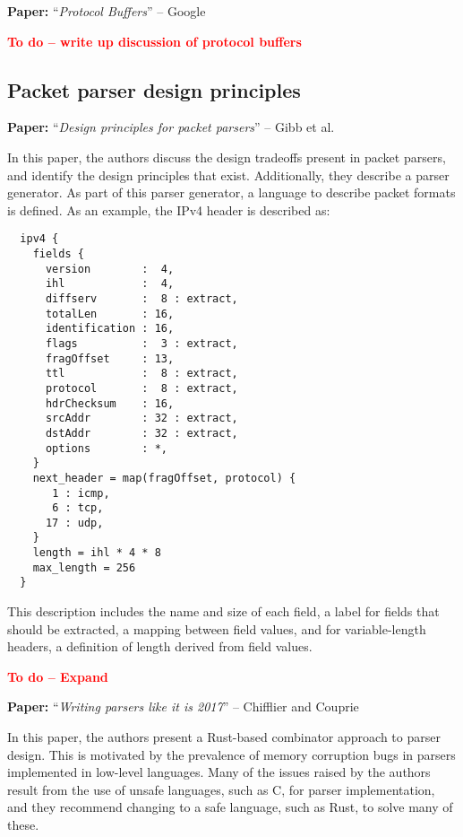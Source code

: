 \documentclass[10pt,a4paper]{article}
\newcommand{\todo}[1]{\textbf{\textcolor{red}{To do -- #1}}}
\newcommand{\paper}[3]{\vspace{4mm}\noindent\textbf{Paper:} ``\textit{#1}'' -- #2 \cite{#3}\vspace{3mm}}
\begin{document}
\paper{Protocol Buffers}{Google}{protocol-buffers}

\todo{write up discussion of protocol buffers}

\subsection{Packet parser design principles}

\paper{Design principles for packet parsers}{Gibb et al.}{gibb2013design}

In this paper, the authors discuss the design tradeoffs present in packet parsers, and
identify the design principles that exist. Additionally, they describe a parser generator.
As part of this parser generator, a language to describe packet formats is defined.
As an example, the IPv4 header is described as:

\begin{verbatim}
  ipv4 {
    fields {
      version        :  4,
      ihl            :  4,
      diffserv       :  8 : extract,
      totalLen       : 16,
      identification : 16,
      flags          :  3 : extract,
      fragOffset     : 13,
      ttl            :  8 : extract,
      protocol       :  8 : extract,
      hdrChecksum    : 16,
      srcAddr        : 32 : extract,
      dstAddr        : 32 : extract,
      options        : *,
    }
    next_header = map(fragOffset, protocol) {
       1 : icmp,
       6 : tcp,
      17 : udp,
    }
    length = ihl * 4 * 8
    max_length = 256
  }
\end{verbatim}

This description includes the name and size of each field, a label for fields that should
be extracted, a mapping between field values, and for variable-length headers, a
definition of length derived from field values.

\todo{Expand}

\paper{Writing parsers like it is 2017}{Chifflier and Couprie}{chifflier2017writing}

In this paper, the authors present a Rust-based combinator approach to parser design. This
is motivated by the prevalence of memory corruption bugs in parsers implemented in
low-level languages. Many of the issues raised by the authors result from the use of
unsafe languages, such as C, for parser implementation, and they recommend changing to a 
safe language, such as Rust, to solve many of these.
\end{document}
